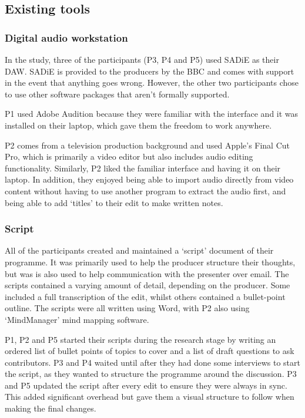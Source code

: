 \subsection{Existing tools}

\subsubsection{Digital audio workstation}
In the study, three of the participants (P3, P4 and P5) used SADiE as their
DAW. SADiE is provided to the producers by the BBC and comes with support in
the event that anything goes wrong. However, the other two participants chose
to use other software packages that aren't formally supported.

P1 used Adobe Audition because they were familiar with the interface and it was
installed on their laptop, which gave them the freedom to work anywhere.

P2 comes from a television production background and used Apple's Final Cut
Pro, which is primarily a video editor but also includes audio editing
functionality.  Similarly, P2 liked the familiar interface and having it on
their laptop. In addition, they enjoyed being able to import audio directly
from video content without having to use another program to extract the audio
first, and being able to add `titles' to their edit to make written notes.

\subsubsection{Script}
All of the participants created and maintained a `script' document of their
programme.  It was primarily used to help the producer structure their
thoughts, but was is also used to help communication with the presenter over
email. The scripts contained a varying amount of detail, depending on the
producer. Some included a full transcription of the edit, whilst others
contained a bullet-point outline. The scripts were all written using Word, with
P2 also using `MindManager' mind mapping software.

P1, P2 and P5 started their scripts during the research stage by writing an
ordered list of bullet points of topics to cover and a list of draft questions
to ask contributors. P3 and P4 waited until after they had done some interviews
to start the script, as they wanted to structure the programme around the
discussion.
P3 and P5 updated the script after every edit to ensure they were always in
sync. This added significant overhead but gave them a visual structure to
follow when making the final changes.

